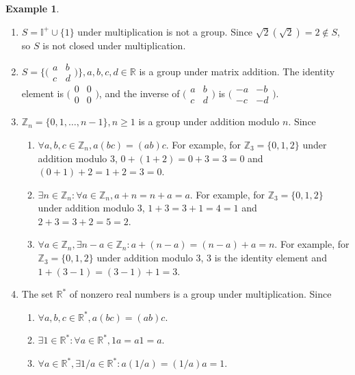 \documentclass{article}
\theoremstyle{definition}
\newtheorem{example}{Example}[section]
\begin{document}
\begin{example}
\begin{enumerate}
    \item $S=\mathbb{I}^+ \cup \{1\}$ under multiplication is not a group. Since $\sqrt{2}(\sqrt{2}) = 2 \notin S$, so $S$ is not closed under multiplication.
    
    \item $S = \big\{ \big(\begin{smallmatrix} a&b\\c&d\end{smallmatrix} \big)\big\}, a,b,c,d \in \mathbb{R}$ is a group under matrix addition. The identity element is $\big(\begin{smallmatrix} 0&0\\0&0\end{smallmatrix} \big)$, and the inverse of $\big(\begin{smallmatrix} a&b\\c&d\end{smallmatrix} \big)$ is $\big(\begin{smallmatrix} -a&-b\\-c&-d\end{smallmatrix} \big)$.
    
    \item $\mathbb{Z}_n = \{0,1,\dots,n-1\},n \geq 1$ is a group under addition modulo $n$. Since
    \begin{enumerate}[label=(\roman*)]
        \item $\forall a,b,c \in \mathbb{Z}_n, a(bc) = (ab)c$. For example, for $\mathbb{Z}_3=\{0,1,2\}$ under addition modulo 3, $0+(1+2) = 0+3 = 3 = 0$ and $(0+1)+2 = 1+2 = 3 =0$.
        \item $\exists n \in \mathbb{Z}_n: \forall a \in \mathbb{Z}_n, a+n=n+a=a$. For example, for $\mathbb{Z}_3=\{0,1,2\}$ under addition modulo 3, $1+3=3+1=4=1$ and $2+3=3+2=5=2$.
        \item $\forall a \in \mathbb{Z}_n, \exists n-a \in \mathbb{Z}_n: a+(n-a) = (n-a)+a = n$. For example, for $\mathbb{Z}_3=\{0,1,2\}$ under addition modulo 3, 3 is the identity element and $1+(3-1) = (3-1)+1 = 3$.
    \end{enumerate}
    
    \item The set $\mathbb{R}^*$ of nonzero real numbers is a group under multiplication. Since
    \begin{enumerate}
        \item $\forall a,b,c \in \mathbb{R}^*, a(bc)=(ab)c$.
        \item $\exists 1 \in \mathbb{R}^*: \forall a \in \mathbb{R}^*, 1a=a1=a.$
        \item $\forall a \in \mathbb{R}^*, \exists 1/a \in \mathbb{R}^*: a(1/a)=(1/a)a=1$.
    \end{enumerate}
    

\end{enumerate}
\end{example}
\end{document}
